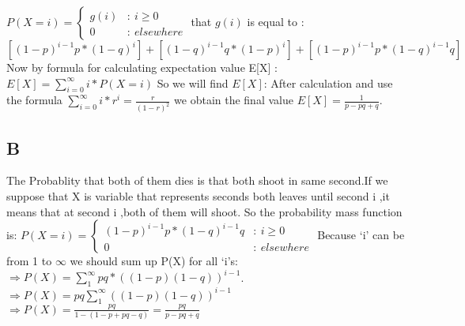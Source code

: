 \documentclass[12pt]{article}
\begin{document}
$P(X=i) = \left\{ \begin{array}{cl}
        g(i) & : \ i \geq 0  \\
        0    & : \ elsewhere
    \end{array} \right. $\newline \newline
that $g(i)$ is equal to :
\newline \newline $[(1-p)^{i-1}p *(1-q)^{i}] + [(1-q)^{i-1} q*(1-p)^{i}] + [(1-p)^{i-1}p * (1-q)^{i-1}q]$
\newline \newline Now by formula  for calculating expectation value E[X] :
\newline \newline $E[X]= \sum_{i=0}^{\infty } i * P(X=i)$
\newline \newline So we will find $E[X]$:
\newline \newline After calculation and use the formula $ \sum_{i=0}^{\infty }i*r^{i}=\frac{r}{(1-r)^{2}} $ we obtain the final value  $E[X] = \frac{1}{p-pq+q}$.
\newline \newline \subsection*{B}
The Probablity that both of them dies is that both shoot in same second.If we
suppose that X is variable that represents seconds both leaves until second i
,it means that at second i ,both of them will shoot. \newline So the
probability mass function is: \newline \newline $P(X=i)=\left\{ \begin{array}{cl}
        (1-p)^{i-1}p * (1-q)^{i-1}q & : \ i \geq 0  \\
        0                           & : \ elsewhere
    \end{array} \right.$\newline \newline
Because `i' can be from 1 to $\infty$ we should sum up P(X) for all `i's:\newline \newline
$\Rightarrow P(X) = \sum_{1}^{\infty } pq * ((1-p)(1-q))^{i-1}$.\newline \newline
$\Rightarrow P(X) = pq \sum_{1}^{\infty }((1-p)(1-q))^{i-1} $\newline \newline
$\Rightarrow P(X)=\frac{pq}{1-(1-p+pq-q)}=\frac{pq}{p-pq+q}$
\end{document}
